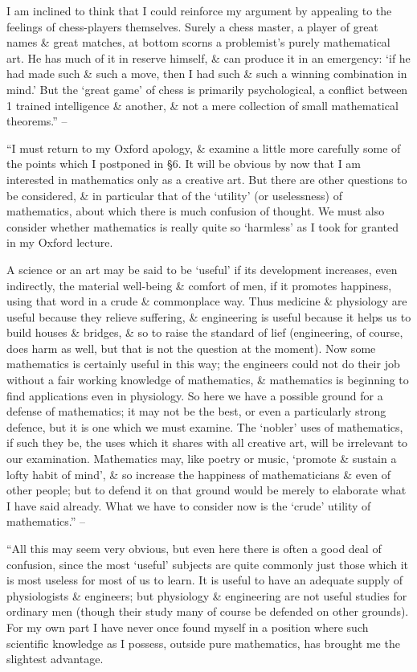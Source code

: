 \documentclass{article}
\numberwithin{equation}{section}
\begin{document}
I am inclined to think that I could reinforce my argument by appealing to the feelings of chess-players themselves. Surely a chess master, a player of great names \& great matches, at bottom scorns a problemist's purely mathematical art. He has much of it in reserve himself, \& can produce it in an emergency: `if he had made such \& such a move, then I had such \& such a winning combination in mind.' But the `great game' of chess is primarily psychological, a conflict between 1 trained intelligence \& another, \& not a mere collection of small mathematical theorems.'' -- \cite[pp. 112--115]{Hardy1992}

 ``I must return to my Oxford apology, \& examine a little more carefully some of the points which I postponed in \S6. It will be obvious by now that I am interested in mathematics only as a creative art. But there are other questions to be considered, \& in particular that of the `utility' (or uselessness) of mathematics, about which there is much confusion of thought. We must also consider whether mathematics is really quite so `harmless' as I took for granted in my Oxford lecture.

A science or an art may be said to be `useful' if its development increases, even indirectly, the material well-being \& comfort of men, if it promotes happiness, using that word in a crude \& commonplace way. Thus medicine \& physiology are useful because they relieve suffering, \& engineering is useful because it helps us to build houses \& bridges, \& so to raise the standard of lief (engineering, of course, does harm as well, but that is not the question at the moment). Now some mathematics is certainly useful in this way; the engineers could not do their job without a fair working knowledge of mathematics, \& mathematics is beginning to find applications even in physiology. So here we have a possible ground for a defense of mathematics; it may not be the best, or even a particularly strong defence, but it is one which we must examine. The `nobler' uses of mathematics, if such they be, the uses which it shares with all creative art, will be irrelevant to our examination. Mathematics may, like poetry or music, `promote \& sustain a lofty habit of mind', \& so increase the happiness of mathematicians \& even of other people; but to defend it on that ground would be merely to elaborate what I have said already. What we have to consider now is the `crude' utility of mathematics.'' -- \cite[pp. 115--117]{Hardy1992}

 ``All this may seem very obvious, but even here there is often a good deal of confusion, since the most `useful' subjects are quite commonly just those which it is most useless for most of us to learn. It is useful to have an adequate supply of physiologists \& engineers; but physiology \& engineering are not useful studies for ordinary men (though their study many of course be defended on other grounds). For my own part I have never once found myself in a position where such scientific knowledge as I possess, outside pure mathematics, has brought me the slightest advantage.
\end{document}
